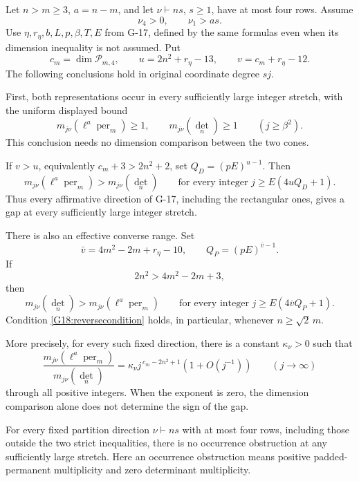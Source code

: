 \begin{theorem}\label{G-18}
Let $n>m\geq3$, $a=n-m$, and let $\nu\vdash ns$, $s\geq1$,
have at most four rows. Assume
\[
 \nu_4>0,\qquad \nu_1>as.
\]
Use $\eta,r_\eta,b,L,p,\beta,T,E$ from G-17, defined by the same
formulas even when its dimension inequality is not assumed. Put
\[
 c_m=\dim\mathcal P_{m,4},\qquad
 u=2n^2+r_\eta-13,\qquad v=c_m+r_\eta-12.
\]
The following conclusions hold in original coordinate degree $sj$.

First, both representations occur in every sufficiently large
integer stretch, with the uniform displayed bound
\begin{equation}\label{G18:occurrence}
 m_{j\nu}(\ell^a\operatorname{per}_m)\geq1,
 \qquad m_{j\nu}(\det_n)\geq1
 \qquad(j\geq\beta^2).
\end{equation}
This conclusion needs no dimension comparison between the two cones.

If $v>u$, equivalently $c_m+3>2n^2+2$, set
$Q_D=(pE)^{u-1}$. Then
\begin{equation}\label{G18:everylargepositive}
 m_{j\nu}(\ell^a\operatorname{per}_m)>m_{j\nu}(\det_n)
 \qquad\text{for every integer }j\geq E(4uQ_D+1).
\end{equation}
Thus every affirmative direction of G-17, including the rectangular
ones, gives a gap at every sufficiently large integer stretch.

There is also an effective converse range. Set
\[
 \bar v=4m^2-2m+r_\eta-10,\qquad Q_P=(pE)^{\bar v-1}.
\]
If
\begin{equation}\label{G18:reversecondition}
 2n^2>4m^2-2m+3,
\end{equation}
then
\begin{equation}\label{G18:everylargereverse}
 m_{j\nu}(\det_n)>m_{j\nu}(\ell^a\operatorname{per}_m)
 \qquad\text{for every integer }j\geq E(4\bar vQ_P+1).
\end{equation}
Condition \eqref{G18:reversecondition} holds, in particular,
whenever $n\geq\sqrt2\,m$.

More precisely, for every such fixed direction,
there is a constant $\kappa_\nu>0$ such that
\begin{equation}\label{G18:ratio}
 \frac{m_{j\nu}(\ell^a\operatorname{per}_m)}
      {m_{j\nu}(\det_n)}
  =\kappa_\nu j^{\,c_m-2n^2+1}(1+O(j^{-1}))
  \qquad(j\longrightarrow\infty)
\end{equation}
through all positive integers. When the exponent is zero, the
dimension comparison alone does not determine the sign of the gap.

For every fixed partition direction $\nu\vdash ns$ with at most
four rows, including those outside the two strict inequalities,
there is no occurrence obstruction at any sufficiently large
stretch. Here an occurrence obstruction means positive
padded-permanent multiplicity and zero determinant multiplicity.
\end{theorem}

